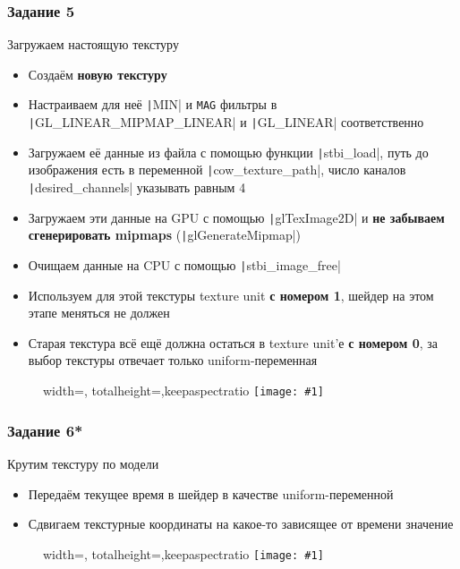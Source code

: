 \documentclass[10pt]{beamer}
\newcommand{\slideimage}[1]{
  \begin{figure}
    \begin{adjustbox}{width=\textwidth, totalheight=\textheight-2\baselineskip-2\baselineskip,keepaspectratio}
      \texttt{[image: \#1]}
    \end{adjustbox}
  \end{figure}
}
\begin{document}
\begin{frame}[fragile]
\frametitle{Задание 5}
Загружаем настоящую текстуру
\begin{itemize}
\item Создаём \textbf{новую текстуру}
\item Настраиваем для неё \texttt|MIN| и \texttt{MAG} фильтры в \texttt|GL_LINEAR_MIPMAP_LINEAR| и \texttt|GL_LINEAR| соответственно
\item Загружаем её данные из файла с помощью функции \texttt|stbi_load|, путь до изображения есть в переменной \texttt|cow_texture_path|, число каналов \texttt|desired_channels| указывать равным 4
\item Загружаем эти данные на GPU с помощью \texttt|glTexImage2D| и \textbf{не забываем сгенерировать mipmaps} (\texttt|glGenerateMipmap|)
\item Очищаем данные на CPU с помощью \texttt|stbi_image_free|
\item Используем для этой текстуры texture unit \textbf{с номером 1}, шейдер на этом этапе меняться не должен
\item Старая текстура всё ещё должна остаться в texture unit'е \textbf{с номером 0}, за выбор текстуры отвечает только uniform-переменная
\end{itemize}
\end{frame}

\begin{frame}[fragile]
\slideimage{5.png}
\end{frame}

\begin{frame}[fragile]
\frametitle{Задание 6*}
Крутим текстуру по модели
\begin{itemize}
\item Передаём текущее время в шейдер в качестве uniform-переменной
\item Сдвигаем текстурные координаты на какое-то зависящее от времени значение
\end{itemize}
\end{frame}

\begin{frame}[fragile]
\slideimage{6.png}
\end{frame}
\end{document}

